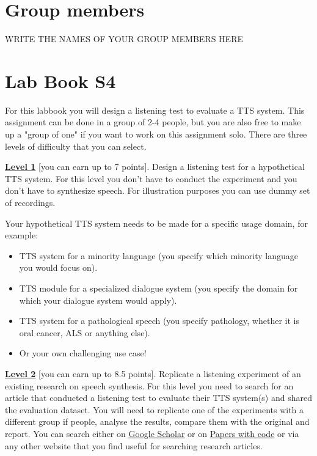 \documentclass{../labbook}
\begin{document}
\section{Group members}
WRITE THE NAMES OF YOUR GROUP MEMBERS HERE

\section{Lab Book S4}
\noindent 
For this labbook you will design a listening test to evaluate a TTS system. This assignment can be done in a group of 2-4 people, but you are also free to make up a "group of one" if you want to work on this assignment solo.
There are three levels of difficulty that you can select.

\bigskip

\underline{\textbf{Level 1}} [you can earn up to 7 points]. Design a listening test for a hypothetical TTS system. For this level you don't have to conduct the experiment and you don't have to synthesize speech. For illustration purposes you can use dummy set of recordings.
 
\smallskip

\noindent Your hypothetical TTS system needs to be made for a specific usage domain, for example:
\begin{itemize}
    \item TTS system for a minority language (you specify which minority language you would focus on). 
    \item TTS module for a specialized dialogue system (you specify the domain for which your dialogue system would apply).
    \item TTS system for a pathological speech (you specify pathology, whether it is oral cancer, ALS or anything else).
    \item Or your own challenging use case!
\end{itemize}

\underline{\textbf{Level 2}} [you can earn up to 8.5 points]. Replicate a listening experiment of an existing research on speech synthesis. For this level you need to search for an article that conducted a listening test to evaluate their TTS system(s) and shared the evaluation dataset. You will need to replicate one of the experiments with a different group if people, analyse the results, compare them with the original and report. 
You can search either on \href{https://scholar.google.com/}{Google Scholar} or on \href{https://paperswithcode.com/}{Papers with code} or via any other website that you find useful for searching research articles.
\end{document}
